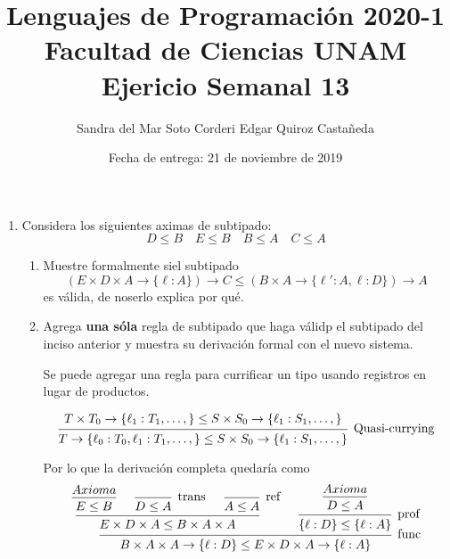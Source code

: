 \documentclass{article}
\title{
    Lenguajes de Programación 2020-1\\
    Facultad de Ciencias UNAM\\
    Ejericio Semanal 13
}
\author{
    Sandra del Mar Soto Corderi \qquad
    Edgar Quiroz Castañeda
}
\date{
    Fecha de entrega: 21 de noviembre de 2019
}
\newcommand{\x}{\times}
\newcommand{\m}{\rightarrow}
\begin{document}
    \maketitle

    \begin{enumerate}
        \item Considera los siguientes aximas de subtipado:
        \[D \leq B \quad E \leq B \quad B \leq A \quad C \leq A\]

        \begin{enumerate}
            \item Muestre formalmente siel subtipado
            \[
                (E \x D \x A \m \{\ell:A\}) \m C \leq 
                (B \x A \m \{\ell':A, \ell:D\}) \m A
            \]
            es válida, de noserlo explica por qué.

            \item Agrega \textbf{una sóla} regla de subtipado que haga válidp el
            subtipado del inciso anterior y muestra su derivación formal con el 
            nuevo sistema.

            Se puede agregar una regla para currificar un tipo usando
            registros en lugar de productos.

            \[
                \begin{prooftree}
                    \hypo{T \x T_0 \m \{\ell_1 : T_1, \dots, \} \leq 
                    S \x S_0 \m \{\ell_1 : S_1, \dots, \}}
                    \infer 1 [Quasi-currying]
                    {T \m \{\ell_0 : T_0, \ell_1 : T_1, \dots, \} \leq 
                    S \x S_0 \m \{\ell_1 : S_1, \dots, \}}
                \end{prooftree}
            \]

            Por lo que la derivación completa quedaría como 
            \[
                \begin{prooftree}
                    \hypo{Axioma}
                    \infer 1 {E \leq B}

                    \infer 0 [trans] {D \leq A}

                    \infer 0 [ref] {A \leq A}

                    \infer 3 {E \x D \x A \leq B \x A \x A}

                    \hypo{Axioma}
                    \infer 1 {D \leq A}

                    \infer 1 [prof] {\{\ell : D\} \leq \{\ell : A\}}

                    \infer 2 [func] {
                        B \x A \x A \m \{\ell : D\} \leq 
                        E \x D \x A \m \{\ell : A\}
                    }


\end{prooftree}\]
\end{enumerate}
\end{enumerate}
\end{document}
